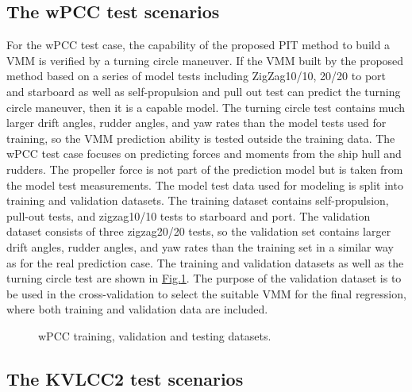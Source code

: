 \documentclass[review]{elsarticle}
\begin{document}
\subsection{The wPCC test scenarios}
\label{\detokenize{05.01_case_studies:wpcc-test-scenarios}}
  
For the wPCC test case, the capability of the proposed PIT method to build a VMM is verified by a turning circle maneuver. If the VMM built by the proposed method based on a series of model tests including ZigZag10/10, 20/20 to port and starboard as well as self-propulsion and pull out test \cite{imo_standards_2002} can predict the turning circle maneuver, then it is a capable model. The turning circle test contains much larger drift angles, rudder angles, and yaw rates than the model tests used for training, so the VMM prediction ability is tested outside the training data.
The wPCC test case focuses on predicting forces and moments from the ship hull and rudders. The propeller force is not part of the prediction model but is taken from the model test measurements.
The model test data used for modeling is split into training and validation datasets. The training dataset contains self-propulsion, pull-out tests, and zigzag10/10 tests to starboard and port. The validation dataset consists of three zigzag20/20 tests, so the validation set contains larger drift angles, rudder angles, and yaw rates than the training set in a similar way as for the real prediction case. The training and validation datasets as well as the turning circle test are shown in \hyperref[\detokenize{05.01_case_studies:fig-traintest}]{Fig.\@ \ref{\detokenize{05.01_case_studies:fig-traintest}}}.
The purpose of the validation dataset is to be used in the cross-validation to select the suitable VMM for the final regression, where both training and validation data are included.

 \begin{figure}[H]
 \centering
 \capstart

 \noindent{}
 \caption{wPCC training, validation and testing datasets.}\label{\detokenize{05.01_case_studies:fig-traintest}}\end{figure}


\subsection{The KVLCC2 test scenarios}
\label{\detokenize{05.01_case_studies:kvlcc2-test-scenarios}}
  
\end{document}
